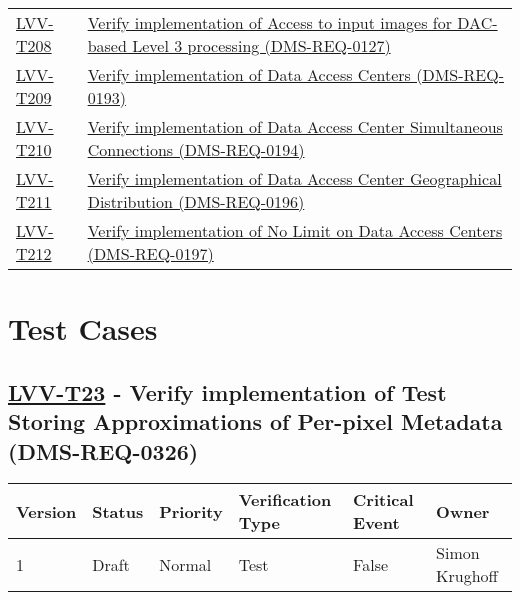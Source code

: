 \begin{longtable}[]{p{3cm}p{13cm}}
\protect\hyperlink{lvv-t208---verify-implementation-of-access-to-input-images-for-dac-based-level-3-processing-dms-req-0127}{LVV-T208}
&
\href{https://jira.lsstcorp.org/secure/Tests.jspa\#/testCase/LVV-T208}{Verify
implementation of Access to input images for DAC-based Level 3
processing (DMS-REQ-0127)}\tabularnewline
\protect\hyperlink{lvv-t209---verify-implementation-of-data-access-centers-dms-req-0193}{LVV-T209}
&
\href{https://jira.lsstcorp.org/secure/Tests.jspa\#/testCase/LVV-T209}{Verify
implementation of Data Access Centers (DMS-REQ-0193)}\tabularnewline
\protect\hyperlink{lvv-t210---verify-implementation-of--data-access-center-simultaneous-connections-dms-req-0194}{LVV-T210}
&
\href{https://jira.lsstcorp.org/secure/Tests.jspa\#/testCase/LVV-T210}{Verify
implementation of Data Access Center Simultaneous Connections
(DMS-REQ-0194)}\tabularnewline
\protect\hyperlink{lvv-t211---verify-implementation-of-data-access-center-geographical-distribution-dms-req-0196}{LVV-T211}
&
\href{https://jira.lsstcorp.org/secure/Tests.jspa\#/testCase/LVV-T211}{Verify
implementation of Data Access Center Geographical Distribution
(DMS-REQ-0196)}\tabularnewline
\protect\hyperlink{lvv-t212---verify-implementation-of-no-limit-on-data-access-centers-dms-req-0197}{LVV-T212}
&
\href{https://jira.lsstcorp.org/secure/Tests.jspa\#/testCase/LVV-T212}{Verify
implementation of No Limit on Data Access Centers
(DMS-REQ-0197)}\tabularnewline
\bottomrule
\end{longtable}

\hypertarget{test-cases}{%
\section{Test Cases}\label{test-cases}}

\hypertarget{lvv-t23---verify-implementation-of-test-storing-approximations-of-per-pixel-metadata-dms-req-0326}{%
\subsection{\texorpdfstring{\href{https://jira.lsstcorp.org/secure/Tests.jspa\#/testCase/LVV-T23}{LVV-T23}
- Verify implementation of Test Storing Approximations of Per-pixel
Metadata
(DMS-REQ-0326)}{LVV-T23 - Verify implementation of Test Storing Approximations of Per-pixel Metadata (DMS-REQ-0326)}}\label{lvv-t23---verify-implementation-of-test-storing-approximations-of-per-pixel-metadata-dms-req-0326}}

\begin{longtable}[]{@{}llllll@{}}
\toprule
Version & Status & Priority & Verification Type & Critical Event &
Owner\tabularnewline
\midrule
\endhead
1 & Draft & Normal & Test & False & Simon Krughoff\tabularnewline
\bottomrule
\end{longtable}

